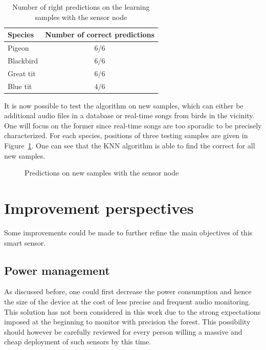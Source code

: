 \documentclass{EPL-master-thesis-covers-EN}
\begin{document}
\begin{table}[H]
\centering
\begin{tabular}{lc}
\toprule
 Species   & Number of correct predictions \\ \midrule
 Pigeon    & 6/6                           \\
 Blackbird & 6/6                           \\
 Great tit & 6/6                           \\
 Blue tit  & 4/6                           \\ \bottomrule
\end{tabular}
\caption{Number of right predictions on the learning samples with the sensor node}
\label{tab:predictions_birds}
\end{table}

It is now possible to test the algorithm on new samples, which can either be additional audio files in a database or real-time songs from birds in the vicinity. One will focus on the former since real-time songs are too sporadic to be precisely characterized. For each species, positions of three testing samples are given in Figure~\ref{fig:test_freq_detection}. One can see that the KNN algorithm is able to find the correct for all new samples.

\begin{figure}[H]
    \centering
    
    \caption{Predictions on new samples with the sensor node}
    \label{fig:test_freq_detection}
\end{figure}


\chapter{Improvement perspectives}
\label{chapter:improvements}

Some improvements could be made to further refine the main objectives of this smart sensor.

\section{Power management}

As discussed before, one could first decrease the power consumption and hence the size of the device at the cost of less precise and frequent audio monitoring. This solution has not been considered in this work due to the strong expectations imposed at the beginning to monitor with precision the forest. This possibility should however be carefully reviewed for every person willing a massive and cheap deployment of such sensors by this time.
\end{document}
